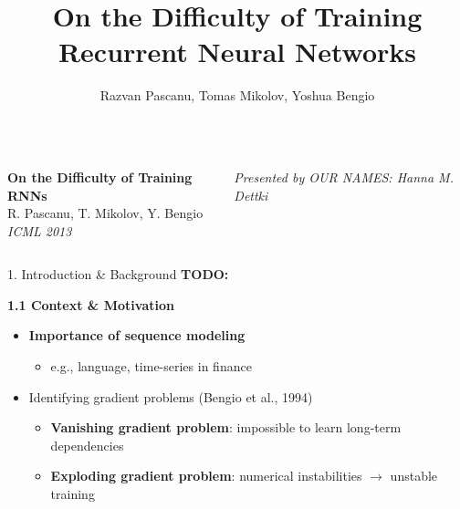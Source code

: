 \documentclass[final]{beamer}
\title{On the Difficulty of Training Recurrent Neural Networks}
\author{Razvan Pascanu, Tomas Mikolov, Yoshua Bengio}
\institute{ICML 2013}
\newcommand{\todo}[1]{\textcolor{myred}{\textbf{TODO:} #1}}
\begin{document}
\begin{frame}[t]
    \begin{columns}[t,totalwidth=\textwidth]
    \begin{column}{0.66\textwidth}
      \vspace{1em}
      {\centering
        {\veryHuge\bfseries On the Difficulty of Training RNNs}\\[0.5em]
        {\Huge R. Pascanu, T. Mikolov, Y. Bengio}\\[0.5em]
        {\Large\itshape ICML 2013}\\
      }
    \end{column}
    \begin{column}{0.33\textwidth}
      \flushright
      \Large \textit{Presented by OUR NAMES: Hanna M. Dettki}
    \end{column}
  \end{columns}
  \vspace{2em}

  \begin{columns}[t,totalwidth=\textwidth]

    \begin{column}{0.33\textwidth}
      \begin{block}{1. Introduction \& Background} \todo{}

        \textbf{1.1 Context \& Motivation}
            \begin{itemize}
            \item \textbf{Importance of sequence modeling}
            \begin{itemize}
                \item e.g., language, time-series in finance
            \end{itemize}

            \item Identifying gradient problems (Bengio et al., 1994)
            \begin{itemize}
                \item \textbf{Vanishing gradient problem}: impossible to learn long-term dependencies
                \item \textbf{Exploding gradient problem}: numerical instabilities $\rightarrow$ unstable training
            \end{itemize}


\end{itemize}
\end{block}
\end{column}
\end{columns}
\end{frame}
\end{document}
